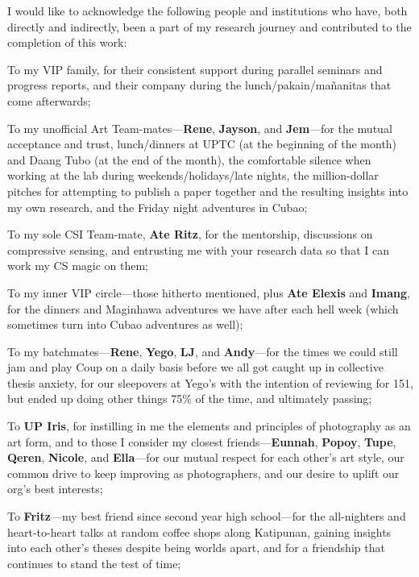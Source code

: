 I would like to acknowledge the following people and institutions who have, both directly and indirectly, been a part of my research journey and contributed to the completion of this work:

To my VIP family, for their consistent support during parallel seminars and progress reports, and their company during the lunch/pakain/ma\~{n}anitas that come afterwards;

To my unofficial Art Team-mates---\textbf{Rene}, \textbf{Jayson}, and \textbf{Jem}---for the mutual acceptance and trust, lunch/dinners at UPTC (at the beginning of the month) and Daang Tubo (at the end of the month), the comfortable silence when working at the lab during weekends/holidays/late nights, the million-dollar pitches for attempting to publish a paper together and the resulting insights into my own research, and the Friday night adventures in Cubao;

To my sole CSI Team-mate, \textbf{Ate Ritz}, for the mentorship, discussions on compressive sensing, and entrusting me with your research data so that I can work my CS magic on them;

To my inner VIP circle---those hitherto mentioned, plus \textbf{Ate Elexis} and \textbf{Imang}, for the dinners and Maginhawa adventures we have after each hell week (which sometimes turn into Cubao adventures as well);

To my batchmates---\textbf{Rene}, \textbf{Yego}, \textbf{LJ}, and \textbf{Andy}---for the times we could still jam and play Coup on a daily basis before we all got caught up in collective thesis anxiety, for our sleepovers at Yego's with the intention of reviewing for 151, but ended up doing other things 75\% of the time, and ultimately passing;

To \textbf{UP Iris}, for instilling in me the elements and principles of photography as an art form, and to those I consider my closest friends---\textbf{Eunnah}, \textbf{Popoy}, \textbf{Tupe}, \textbf{Qeren}, \textbf{Nicole}, and \textbf{Ella}---for our mutual respect for each other's art style, our common drive to keep improving as photographers, and our desire to uplift our org's best interests;

To \textbf{Fritz}---my best friend since second year high school---for the all-nighters and heart-to-heart talks at random coffee shops along Katipunan, gaining insights into each other's theses despite being worlds apart, and for a friendship that continues to stand the test of time;

